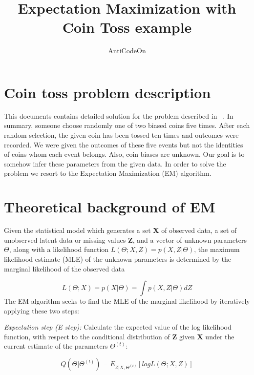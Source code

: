 \documentclass[11pt]{article}
\begin{document}
\title{Expectation Maximization with Coin Toss example}
\author{AntiCodeOn}
\maketitle
\section{Coin toss problem description}
This documents contains detailed solution for the problem described in ~\cite{nature}. In summary, someone choose randomly one of two biased coins five times. After each random selection, the given coin has been tossed ten times and outcomes were recorded. We were given the outcomes of these five events but not the identities of coins whom each event belongs. Also, coin biases are unknown. Our goal is to somehow infer these parameters from the given data. In order to solve the problem we resort to the Expectation Maximization (EM) algorithm. 

\section{Theoretical background of EM}

Given the statistical model which generates a set \textbf{X} of observed data, a set of unobserved latent data or missing values \textbf{Z}, and a vector of unknown parameters \textbf{$\Theta$}, along with a likelihood function \boldmath$\textit{L}(\Theta;X,Z) = \textit{p}(X,Z|\Theta)$,
the maximum likelihood estimate (MLE) of the unknown parameters is determined by the marginal likelihood of the observed data

\begin{equation}
\textit{L}(\Theta;X)=\textit{p}(X|\Theta)=\int\textit{p}(X,Z|\Theta)\textit{d}Z
\end{equation}
The EM algorithm seeks to find the MLE of the marginal likelihood by iteratively applying these two steps:

\textit{Expectation step (E step):} Calculate the expected value of the log likelihood function, with respect to the conditional distribution of \textbf{Z} given \textbf{X} under the current estimate of the parameters $\Theta^{(t)}$:

\begin{equation}\label{exstep}
Q(\Theta|\Theta^{(t)})=E_{Z|X,\Theta^{(t)}}[log\textit{L}(\Theta;X,Z)]    
\end{equation}
\end{document}
